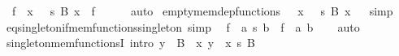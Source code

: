 \begin{isabellebody}
\ \ {\isachardoublequoteopen}{\isacharparenleft}{\kern0pt}f\ {\isasymin}\ {\isacharparenleft}{\kern0pt}x\ {\isasymin}\ {\isacharbraceleft}{\kern0pt}{\isacharbraceright}{\kern0pt}{\isacharparenright}{\kern0pt}\ {\isasymrightarrow}s\ {\isacharparenleft}{\kern0pt}B\ x{\isacharparenright}{\kern0pt}{\isacharparenright}{\kern0pt}\ {\isasymlongleftrightarrow}\ f\ {\isacharequal}{\kern0pt}\ {\isacharbraceleft}{\kern0pt}{\isacharbraceright}{\kern0pt}{\isachardoublequoteclose}\isanewline
%
\isadelimproof
\ \ %
\endisadelimproof
%
\isatagproof
{}\isamarkupfalse%
\ auto%
\endisatagproof
{\isafoldproof}%
%
\isadelimproof
\isanewline
%
\endisadelimproof
\isanewline
{}\isamarkupfalse%
\ empty{\isacharunderscore}{\kern0pt}mem{\isacharunderscore}{\kern0pt}dep{\isacharunderscore}{\kern0pt}functions{\isacharcolon}{\kern0pt}\ {\isachardoublequoteopen}{\isacharbraceleft}{\kern0pt}{\isacharbraceright}{\kern0pt}\ {\isasymin}\ {\isacharparenleft}{\kern0pt}x\ {\isasymin}\ {\isacharbraceleft}{\kern0pt}{\isacharbraceright}{\kern0pt}{\isacharparenright}{\kern0pt}\ {\isasymrightarrow}s\ {\isacharparenleft}{\kern0pt}B\ x{\isacharparenright}{\kern0pt}{\isachardoublequoteclose}%
\isadelimproof
\ %
\endisadelimproof
%
\isatagproof
{}\isamarkupfalse%
\ simp%
\endisatagproof
{\isafoldproof}%
%
\isadelimproof
%
\endisadelimproof
\isanewline
\isanewline
{}\isamarkupfalse%
\ eq{\isacharunderscore}{\kern0pt}singleton{\isacharunderscore}{\kern0pt}if{\isacharunderscore}{\kern0pt}mem{\isacharunderscore}{\kern0pt}functions{\isacharunderscore}{\kern0pt}singleton\ {\isacharbrackleft}{\kern0pt}simp{\isacharbrackright}{\kern0pt}{\isacharcolon}{\kern0pt}\isanewline
\ \ {\isachardoublequoteopen}f\ {\isasymin}\ {\isacharbraceleft}{\kern0pt}a{\isacharbraceright}{\kern0pt}\ {\isasymrightarrow}s\ {\isacharbraceleft}{\kern0pt}b{\isacharbraceright}{\kern0pt}\ {\isasymLongrightarrow}\ f\ {\isacharequal}{\kern0pt}\ {\isacharbraceleft}{\kern0pt}{\isasymlangle}a{\isacharcomma}{\kern0pt}\ b{\isasymrangle}{\isacharbraceright}{\kern0pt}{\isachardoublequoteclose}\isanewline
%
\isadelimproof
\ \ %
\endisadelimproof
%
\isatagproof
{}\isamarkupfalse%
\ auto%
\endisatagproof
{\isafoldproof}%
%
\isadelimproof
\isanewline
%
\endisadelimproof
\isanewline
{}\isamarkupfalse%
\ singleton{\isacharunderscore}{\kern0pt}mem{\isacharunderscore}{\kern0pt}functionsI\ {\isacharbrackleft}{\kern0pt}intro{\isacharbrackright}{\kern0pt}{\isacharcolon}{\kern0pt}\ {\isachardoublequoteopen}y\ {\isasymin}\ B\ {\isasymLongrightarrow}\ {\isacharbraceleft}{\kern0pt}{\isasymlangle}x{\isacharcomma}{\kern0pt}\ y{\isasymrangle}{\isacharbraceright}{\kern0pt}\ {\isasymin}\ {\isacharbraceleft}{\kern0pt}x{\isacharbraceright}{\kern0pt}\ {\isasymrightarrow}s\ B{\isachardoublequoteclose}\isanewline

\end{isabellebody}
